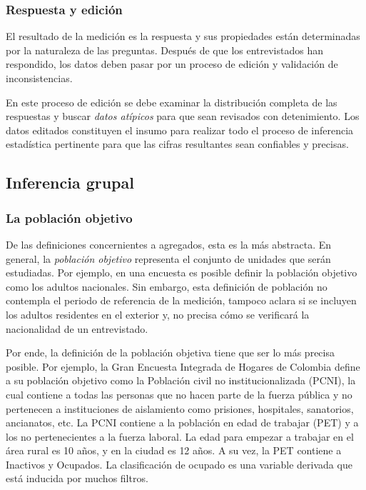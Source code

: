 \documentclass[
  12pt,
]{book}
\begin{document}
\hypertarget{respuesta-y-ediciuxf3n}{%
\subsubsection{Respuesta y edición}\label{respuesta-y-ediciuxf3n}}

El resultado de la medición es la respuesta y sus propiedades están determinadas por la naturaleza de las preguntas. Después de que los entrevistados han respondido, los datos deben pasar por un proceso de edición y validación de inconsistencias.

En este proceso de edición se debe examinar la distribución completa de las respuestas y buscar \emph{datos atípicos} para que sean revisados con detenimiento. Los datos editados constituyen el insumo para realizar todo el proceso de inferencia estadística pertinente para que las cifras resultantes sean confiables y precisas.

\hypertarget{inferencia-grupal}{%
\subsection{Inferencia grupal}\label{inferencia-grupal}}

\hypertarget{la-poblaciuxf3n-objetivo}{%
\subsubsection{La población objetivo}\label{la-poblaciuxf3n-objetivo}}

De las definiciones concernientes a agregados, esta es la más abstracta. En general, la \emph{población objetivo} representa el conjunto de unidades que serán estudiadas. Por ejemplo, en una encuesta es posible definir la población objetivo como los adultos nacionales. Sin embargo, esta definición de población no contempla el periodo de referencia de la medición, tampoco aclara si se incluyen los adultos residentes en el exterior y, no precisa cómo se verificará la nacionalidad de un entrevistado.

Por ende, la definición de la población objetiva tiene que ser lo más precisa posible. Por ejemplo, la Gran Encuesta Integrada de Hogares de Colombia define a su población objetivo como la Población civil no institucionalizada (PCNI), la cual contiene a todas las personas que no hacen parte de la fuerza pública y no pertenecen a instituciones de aislamiento como prisiones, hospitales, sanatorios, ancianatos, etc. La PCNI contiene a la población en edad de trabajar (PET) y a los no pertenecientes a la fuerza laboral. La edad para empezar a trabajar en el área rural es 10 años, y en la ciudad es 12 años. A su vez, la PET contiene a Inactivos y Ocupados. La clasificación de ocupado es una variable derivada que está inducida por muchos filtros.
\end{document}
